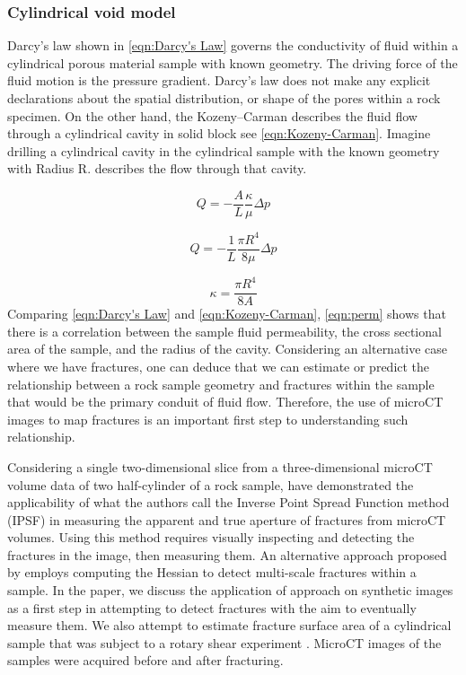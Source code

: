 \documentclass{edger}
\begin{document}
\subsubsection{Cylindrical void model}
Darcy's law shown in \autoref{eqn:Darcy's Law} \citep{Darcy1856} governs the conductivity of fluid within a cylindrical porous material sample with known geometry. The driving force of the fluid motion is the pressure gradient. Darcy's law does not make any explicit declarations about the spatial distribution, or shape of the pores within a rock specimen. On the other hand, the Kozeny--Carman \citep{Carman1961, Mavko2009} describes the fluid flow through a cylindrical cavity in solid block see \autoref{eqn:Kozeny-Carman}. Imagine drilling a cylindrical cavity in the cylindrical sample with the known geometry with Radius R.  describes the flow through that cavity. 

\begin{equation}
Q = - \frac{A}{L} \frac{\kappa }{\mu} \Delta p \label{eqn:Darcy's Law}
\end{equation}

\begin{equation}
Q = - \frac{1}{L} \frac{\pi R^4}{8\mu} \Delta p \label{eqn:Kozeny-Carman}
\end{equation}

\begin{equation}
\kappa = \frac{\pi R^4}{8A} \label{eqn:perm}
\end{equation}
Comparing \autoref{eqn:Darcy's Law} and \autoref{eqn:Kozeny-Carman}, \autoref{eqn:perm} shows that there is a correlation between the sample fluid permeability, the cross sectional area of the sample, and the radius of the cavity. Considering an alternative case where we have fractures, one can deduce that we can estimate or predict the relationship between a rock sample geometry and fractures within the sample that would be the primary conduit of fluid flow. Therefore, the use of microCT images to map fractures is an important first step to understanding such relationship. 

Considering a single two-dimensional slice from a three-dimensional microCT volume data of two half-cylinder of a rock sample, \cite{Ketcham2010} have demonstrated the applicability of what the authors call the Inverse Point Spread Function method (IPSF) in measuring the apparent and true aperture of fractures from microCT volumes. Using this method requires visually inspecting and detecting the fractures in the image, then measuring them. An alternative approach proposed by \cite{Voorn2013} employs computing the Hessian to detect multi-scale fractures within a sample. In the paper, we discuss the application of \cite{Voorn2013} approach on synthetic images as a first step in attempting to detect fractures with the aim to eventually measure them. We also attempt to estimate fracture surface area of a cylindrical sample that was subject to a rotary shear experiment \citep{Zhao2017}. MicroCT images of the samples were acquired before and after fracturing.
\end{document}
